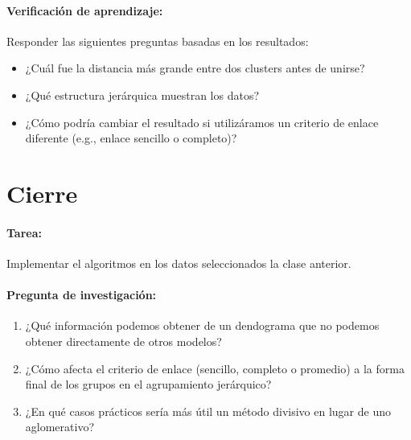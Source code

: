 \documentclass[a4,11pt]{aleph-notas}
\begin{document}
\paragraph{Verificación de aprendizaje:}  
Responder las siguientes preguntas basadas en los resultados:
\begin{itemize}[leftmargin=*]
    \item ¿Cuál fue la distancia más grande entre dos clusters antes de unirse?
    \item ¿Qué estructura jerárquica muestran los datos?
    \item ¿Cómo podría cambiar el resultado si utilizáramos un criterio de enlace diferente (e.g., enlace sencillo o completo)?
\end{itemize}






\section*{Cierre}

\paragraph{Tarea:}  
    Implementar el algoritmos en los datos seleccionados la clase anterior.

\paragraph{Pregunta de investigación:}  
\begin{enumerate}[leftmargin=*]
    \item ¿Qué información podemos obtener de un dendograma que no podemos obtener directamente de otros modelos?
    \item ¿Cómo afecta el criterio de enlace (sencillo, completo o promedio) a la forma final de los grupos en el agrupamiento jerárquico?
    \item ¿En qué casos prácticos sería más útil un método divisivo en lugar de uno aglomerativo?
\end{enumerate}
    
\end{document}
